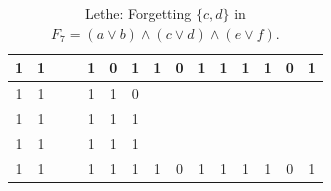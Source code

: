 \begin{table}[!tb]
\begin{tabular}{|c|c|c|c|c|c|c|c|c|c|c|c|c|c|c|}
        \rowcolor{yellow!40} 1 & 1 &  &  & 1 & 0 & 1 & 1 & 0 & 1 & 1 & 1 & 1 & 0 & 1 \\ \hline
        \rowcolor{gray!40} 1 & 1 &  &  & 1 & 1 & 0 &  &  &  &  &  &  &  &  \\ \hline
        \rowcolor{gray!40} 1 & 1 &  &  & 1 & 1 & 1 &  &  &  &  &  &  &  &  \\ \hline
        \rowcolor{gray!40} 1 & 1 &  &  & 1 & 1 & 1 &  &  &  &  &  &  &  &  \\ \hline
        \rowcolor{gray!40} 1 & 1 &  &  & 1 & 1 & 1 & 1 & 0 & 1 & 1 & 1 & 1 & 0 & 1 \\ \hline
    \end{tabular}
    \caption{Lethe: Forgetting $\{c, d\}$ in $F_{7} = (a \lor b) \land (c \lor d) \land (e \lor f)$.}
    \label{tab:lethe-F7-cd}
\end{table}
